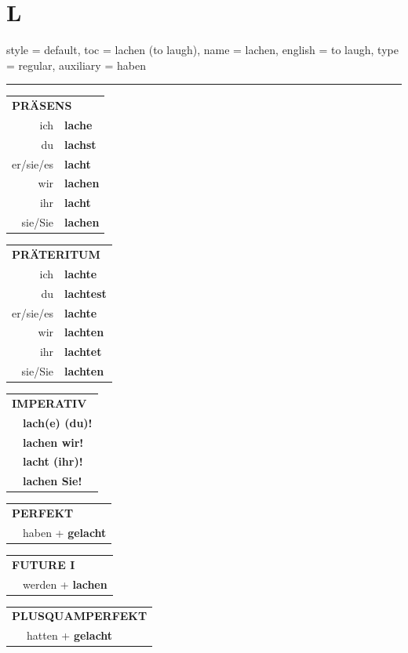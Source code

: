 \section{L}

\begin{verbentry}{
  style = {default},
  toc = {lachen (to laugh)},
  name = {lachen},
  english = {to laugh},
  type = {regular},
  auxiliary = {haben}
}
 

\vspace{5pt}
\hrule
\vspace{5pt}

\begin{tabular}{rl}
\multicolumn{2}{l}{\textbf{PRÄSENS}}\\
ich & \textbf{lache}\\
du & \textbf{lachst}\\
er/sie/es & \textbf{lacht}\\
wir & \textbf{lachen}\\
ihr & \textbf{lacht}\\
sie/Sie & \textbf{lachen}\\
\end{tabular}
\hfill
\begin{tabular}{rl}
\multicolumn{2}{l}{\textbf{PRÄTERITUM}}\\
ich & \textbf{lachte}\\
du & \textbf{lachtest}\\
er/sie/es & \textbf{lachte}\\
wir & \textbf{lachten}\\
ihr & \textbf{lachtet}\\
sie/Sie & \textbf{lachten}\\
\end{tabular}
\hfill
\begin{tabular}{rl}
\multicolumn{2}{l}{\textbf{IMPERATIV}}\\
& \textbf{lach(e) (du)!}\\
& \textbf{lachen wir!}\\
& \textbf{lacht (ihr)!}\\
& \textbf{lachen Sie!}\\
\end{tabular}

\vspace{10pt}

\begin{tabular}{rl}
\multicolumn{2}{l}{\textbf{PERFEKT}}\\
& haben + \textbf{gelacht}\\
\end{tabular}
\hfill
\begin{tabular}{rl}
\multicolumn{2}{l}{\textbf{FUTURE I}}\\
& werden + \textbf{lachen}\\
\end{tabular}
\hfill
\begin{tabular}{rl}
\multicolumn{2}{l}{\textbf{PLUSQUAMPERFEKT}}\\
& hatten + \textbf{gelacht}\\
\end{tabular}


\end{verbentry}
